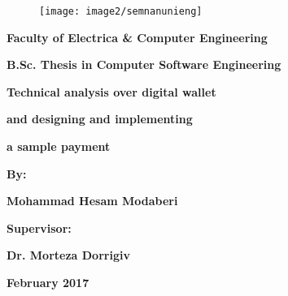 \documentclass[oneside]{report}
\begin{document}
	
	\begin{latin}
		\begin{figure}
			\centering
			\texttt{[image: image2/semnanunieng]}
		\end{figure}

		\begin{center}
		
		\textbf{\Large Faculty of Electrica \&  Computer Engineering}
		
		\vspace*{1cm}
		
		\textbf{\huge B.Sc. Thesis in Computer Software Engineering}
		
		\vspace*{1.3cm}
		
		\textbf{\huge Technical analysis over digital wallet }			
		
		\vspace*{0.3cm}
					
		\textbf{\huge and designing and implementing}			
		
		\vspace*{0.3cm}
		
		\textbf{\huge a sample payment}			
					
		\vspace*{1.3cm}			
		
		\textbf{\Large By:}
		
		\vspace*{0.5cm}			
		
		\textbf{\huge Mohammad Hesam Modaberi}
		
		\vspace*{1.5cm}
					
		\textbf{\Large Supervisor:}
		
		\vspace*{0.5cm}
		
		\textbf{\huge Dr. Morteza Dorrigiv}
		
		\vspace*{3cm}
		
		\textbf{\LARGE February 2017}		
				
					
		\end{center}
		
	\end{latin}
	
\end{document}
